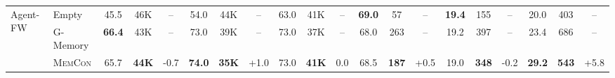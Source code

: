 \documentclass{article} %
\theoremstyle{plain}
\theoremstyle{definition}
\theoremstyle{remark}
\newcommand{\ours}{\textsc{MemCon}\xspace}
\begin{document}
\begin{table}[t]
{\begin{tabular}{ll ccc ccc ccc ccc ccc ccc}
\multirow{3}{*}{Agent-FW}
& Empty 
& 45.5 & 46K & -- & 54.0 & 44K & -- & 63.0 & 41K & --
& \textbf{69.0} & 57 & -- & \textbf{19.4} & 155 & --
& 20.0 & 403 & -- \\
& G-Memory 
& \textbf{66.4} & 43K & -- & 73.0 & 39K & -- & 73.0 & 37K & --
& 68.0 & 263 & -- & 19.2 & 397 & --
& 23.4 & 686 & -- \\
& \ours 
& 65.7 & \textbf{44K} & -0.7 
& \textbf{74.0} & \textbf{35K} & \cellcolor{mygreen}+1.0 
& 73.0 & \textbf{41K} & 0.0
& 68.5 & \textbf{187} & \cellcolor{mygreen}+0.5 
& 19.0 & \textbf{348} & -0.2
& \textbf{29.2} & \textbf{543} & \cellcolor{mygreen}+5.8 \\
\bottomrule

\end{tabular}
}
\end{table}






\end{document}
